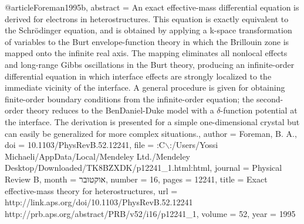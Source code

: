 @article{Foreman1995b,
abstract = {An exact effective-mass differential equation is derived for electrons in heterostructures. This equation is exactly equivalent to the Schr\"{o}dinger equation, and is obtained by applying a k-space transformation of variables to the Burt envelope-function theory in which the Brillouin zone is mapped onto the infinite real axis. The mapping eliminates all nonlocal effects and long-range Gibbs oscillations in the Burt theory, producing an infinite-order differential equation in which interface effects are strongly localized to the immediate vicinity of the interface. A general procedure is given for obtaining finite-order boundary conditions from the infinite-order equation; the second-order theory reduces to the BenDaniel-Duke model with a $\delta$-function potential at the interface. The derivation is presented for a simple one-dimensional crystal but can easily be generalized for more complex situations.},
author = {Foreman, B. A.},
doi = {10.1103/PhysRevB.52.12241},
file = {:C$\backslash$:/Users/Yossi Michaeli/AppData/Local/Mendeley Ltd./Mendeley Desktop/Downloaded/TK8BZXDK/p12241\_1.html:html},
journal = {Physical Review B},
month = {אוקטובר},
number = {16},
pages = {12241},
title = {{Exact effective-mass theory for heterostructures}},
url = {http://link.aps.org/doi/10.1103/PhysRevB.52.12241 http://prb.aps.org/abstract/PRB/v52/i16/p12241\_1},
volume = {52},
year = {1995}
}
